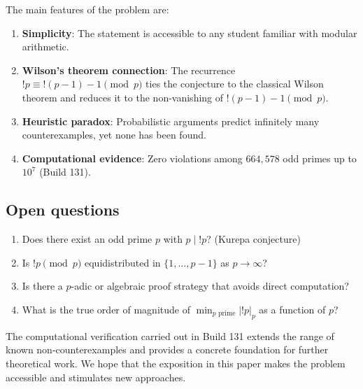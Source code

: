 \documentclass[12pt,a4paper]{amsart}
\theoremstyle{definition}
\begin{document}
The main features of the problem are:

\begin{enumerate}
\item \textbf{Simplicity}: The statement is accessible to any student
      familiar with modular arithmetic.
\item \textbf{Wilson's theorem connection}: The recurrence
      $!p \equiv !(p-1) - 1 \pmod p$ ties the conjecture to the classical
      Wilson theorem and reduces it to the non-vanishing of $!(p-1) - 1 \pmod p$.
\item \textbf{Heuristic paradox}: Probabilistic arguments predict infinitely
      many counterexamples, yet none has been found.
\item \textbf{Computational evidence}: Zero violations among $664{,}578$
      odd primes up to $10^7$ (Build 131).
\end{enumerate}

\subsection*{Open questions}
\begin{enumerate}
\item Does there exist an odd prime $p$ with $p \mid !p$? (Kurepa conjecture)
\item Is $!p \pmod p$ equidistributed in $\{1, \ldots, p-1\}$ as $p \to \infty$?
\item Is there a $p$-adic or algebraic proof strategy that avoids direct
      computation?
\item What is the true order of magnitude of $\min_{p \text{ prime}} |!p|_p$
      as a function of $p$?
\end{enumerate}

The computational verification carried out in Build 131 extends the range of
known non-counterexamples and provides a concrete foundation for further
theoretical work.
We hope that the exposition in this paper makes the problem accessible and
stimulates new approaches.
\end{document}
